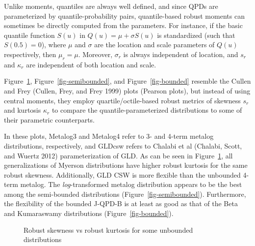 \documentclass[
]{interact}
\begin{document}
Unlike moments, quantiles are always well defined, and since QPDs are
parameterized by quantile-probability pairs, quantile-based robust
moments can sometimes be directly computed from the parameters. For
instance, if the basic quantile function \(S(u)\) in
\(Q(u)=\mu+\sigma S(u)\) is standardized (such that \(S(0.5)=0\)), where
\(\mu\) and \(\sigma\) are the location and scale parameters of \(Q(u)\)
respectively, then \(\mu_r=\mu\). Moreover, \(\sigma_r\) is always
independent of location, and \(s_r\) and \(\kappa_r\) are independent of
both location and scale.

Figure~\ref{fig-unbounded}, Figure~\ref{fig-semibounded}, and
Figure~\ref{fig-bounded} resemble the Cullen and Frey (Cullen, Frey, and
Frey 1999) plots (Pearson plots), but instead of using central moments,
they employ quartile/octile-based robust metrics of skewness \(s_r\) and
kurtosis \(\kappa_r\) to compare the quantile-parameterized
distributions to some of their parametric counterparts.

In these plots, Metalog3 and Metalog4 refer to 3- and 4-term metalog
distributions, respectively, and GLDcsw refers to Chalabi et al
(Chalabi, Scott, and Wuertz 2012) parameterization of GLD. As can be
seen in Figure~\ref{fig-unbounded}, all generalizations of Myerson
distributions have higher robust kurtosis for the same robust skewness.
Additionally, GLD CSW is more flexible than the unbounded 4-term
metalog. The \emph{log}-transformed metalog distribution appears to be
the best among the semi-bounded distributions
(Figure~\ref{fig-semibounded}). Furthermore, the flexibility of the
bounded J-QPD-B is at least as good as that of the Beta and Kumaraswamy
distributions (Figure~\ref{fig-bounded}).

\begin{figure}


\caption{\label{fig-unbounded}Robust skewness vs robust kurtosis for
some unbounded distributions}

\end{figure}%
\end{document}
